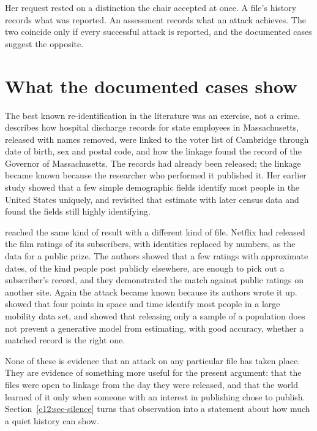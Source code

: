 Her request rested on a distinction the chair accepted at once. A file's history
records what was reported. An assessment records what an attack achieves. The two
coincide only if every successful attack is reported, and the documented cases
suggest the opposite.

\section{What the documented cases show}

The best known re-identification in the literature was an exercise, not a crime.
\citet{sweeney2002} describes how hospital discharge records for state employees in
Massachusetts, released with names removed, were linked to the voter list of
Cambridge through date of birth, sex and postal code, and how the linkage found the
record of the Governor of Massachusetts. The records had already been released; the
linkage became known because the researcher who performed it published it. Her
earlier study \citep{sweeney2000} showed that a few simple demographic fields
identify most people in the United States uniquely, and \citet{golle2006} revisited
that estimate with later census data and found the fields still highly identifying.

\citet{narayanan2008} reached the same kind of result with a different kind of
file. Netflix had released the film ratings of its subscribers, with identities
replaced by numbers, as the data for a public prize. The authors showed that a few
ratings with approximate dates, of the kind people post publicly elsewhere, are
enough to pick out a subscriber's record, and they demonstrated the match against
public ratings on another site. Again the attack became known because its authors
wrote it up. \citet{demontjoye2013} showed that four points in space and time
identify most people in a large mobility data set, and \citet{rocher2019} showed
that releasing only a sample of a population does not prevent a generative model
from estimating, with good accuracy, whether a matched record is the right one.

None of these is evidence that an attack on any particular file has taken place. They
are evidence of something more useful for the present argument: that the files were
open to linkage from the day they were released, and that the world learned of it
only when someone with an interest in publishing chose to publish. Section~\ref{c12:sec-silence}
turns that observation into a statement about how much a quiet history can
show.


